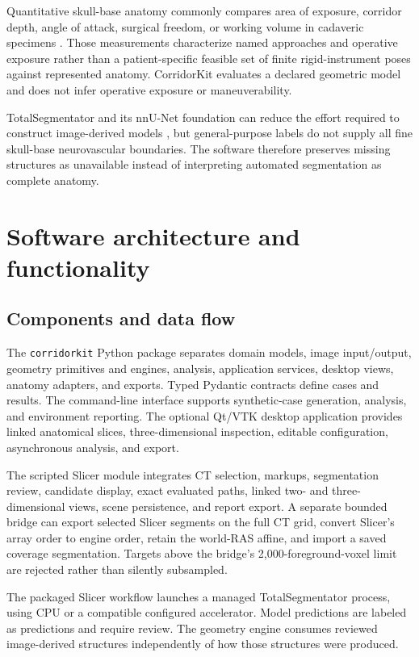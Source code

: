 \documentclass[preprint,12pt]{elsarticle}
\begin{document}
Quantitative skull-base anatomy commonly compares area of exposure, corridor depth, angle of attack, surgical freedom, or working volume in cadaveric specimens \citep{roth2009,wilson2014,elhadi2014,lin2021,agosti2022}. Those measurements characterize named approaches and operative exposure rather than a patient-specific feasible set of finite rigid-instrument poses against represented anatomy. CorridorKit evaluates a declared geometric model and does not infer operative exposure or maneuverability.

TotalSegmentator and its nnU-Net foundation can reduce the effort required to construct image-derived models \citep{totalsegmentator,nnunet}, but general-purpose labels do not supply all fine skull-base neurovascular boundaries. The software therefore preserves missing structures as unavailable instead of interpreting automated segmentation as complete anatomy.

\section{Software architecture and functionality}

\subsection{Components and data flow}

The \texttt{corridorkit} Python package separates domain models, image input/output, geometry primitives and engines, analysis, application services, desktop views, anatomy adapters, and exports. Typed Pydantic contracts define cases and results. The command-line interface supports synthetic-case generation, analysis, and environment reporting. The optional Qt/VTK desktop application provides linked anatomical slices, three-dimensional inspection, editable configuration, asynchronous analysis, and export.

The scripted Slicer module integrates CT selection, markups, segmentation review, candidate display, exact evaluated paths, linked two- and three-dimensional views, scene persistence, and report export. A separate bounded bridge can export selected Slicer segments on the full CT grid, convert Slicer's array order to engine order, retain the world-RAS affine, and import a saved coverage segmentation. Targets above the bridge's 2,000-foreground-voxel limit are rejected rather than silently subsampled.

The packaged Slicer workflow launches a managed TotalSegmentator \citep{totalsegmentator} process, using CPU or a compatible configured accelerator. Model predictions are labeled as predictions and require review. The geometry engine consumes reviewed image-derived structures independently of how those structures were produced.
\end{document}
